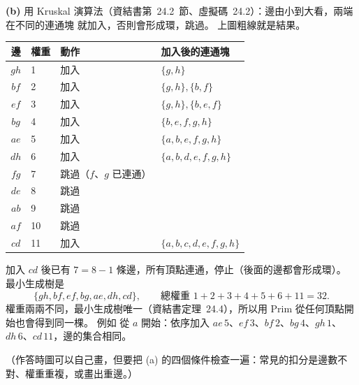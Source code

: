 \begin{pastsoln}
\textbf{(b)} 用 Kruskal 演算法（資結書第~24.2~節、虛擬碼~24.2）：邊由小到大看，兩端在不同的連通塊
就加入，否則會形成環，跳過。 上圖粗線就是結果。

\begin{center}
\small
\begin{tabular}{clll}
\toprule
邊 & 權重 & 動作 & 加入後的連通塊 \\
\midrule
$gh$ & 1 & 加入 & $\{g, h\}$ \\
$bf$ & 2 & 加入 & $\{g, h\}, \{b, f\}$ \\
$ef$ & 3 & 加入 & $\{g, h\}, \{b, e, f\}$ \\
$bg$ & 4 & 加入 & $\{b, e, f, g, h\}$ \\
$ae$ & 5 & 加入 & $\{a, b, e, f, g, h\}$ \\
$dh$ & 6 & 加入 & $\{a, b, d, e, f, g, h\}$ \\
$fg$ & 7 & 跳過（$f$、$g$ 已連通） & \\
$de$ & 8 & 跳過 & \\
$ab$ & 9 & 跳過 & \\
$af$ & 10 & 跳過 & \\
$cd$ & 11 & 加入 & $\{a, b, c, d, e, f, g, h\}$ \\
\bottomrule
\end{tabular}
\end{center}

加入 $cd$ 後已有 $7 = 8 - 1$ 條邊，所有頂點連通，停止（後面的邊都會形成環）。 最小生成樹是
\[
\{gh, bf, ef, bg, ae, dh, cd\},\qquad \text{總權重 } 1 + 2 + 3 + 4 + 5 + 6 + 11 = 32 .
\]
權重兩兩不同，最小生成樹唯一（資結書定理~24.4），所以用 Prim 從任何頂點開始也會得到同一棵。 例如
從 $a$ 開始：依序加入 $ae\,5$、$ef\,3$、$bf\,2$、$bg\,4$、$gh\,1$、$dh\,6$、$cd\,11$，邊的集合相同。

（作答時圖可以自己畫，但要把 (a) 的四個條件檢查一遍：常見的扣分是邊數不對、權重重複，或畫出重邊。）
\end{pastsoln}

